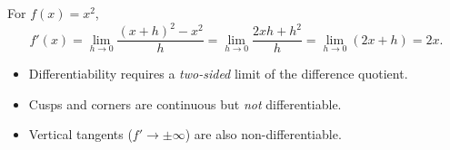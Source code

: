 \begin{example}
For $f(x) = x^2$,
\[ f'(x) = \lim_{h \to 0} \frac{(x+h)^2 - x^2}{h} = \lim_{h \to 0} \frac{2xh + h^2}{h} = \lim_{h \to 0} (2x + h) = 2x. \]
\end{example}

\begin{pitfallbox}
\begin{itemize}[leftmargin=*,nosep]
  \item Differentiability requires a \emph{two-sided} limit of the difference quotient.
  \item Cusps and corners are continuous but \emph{not} differentiable.
  \item Vertical tangents ($f'\to\pm\infty$) are also non-differentiable.
\end{itemize}
\end{pitfallbox}
